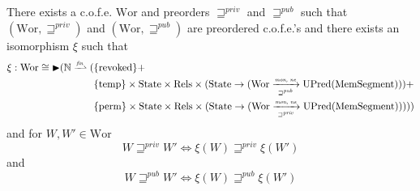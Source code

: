 \documentclass[a4paper]{article}
\newcommand{\finparfun}{\xrightharpoonup{\textit{\tiny{fin}}}}
\newcommand{\monnefun}{\xrightarrow{\textit{\tiny{mon, ne}}}}
\newcommand{\fun}{\rightarrow}
\newcommand{\blater}{\mathop{\blacktriangleright}}
\newcommand{\cofe}{c.o.f.e.}
\newcommand{\cofes}{\cofe{}'s}
\newcommand{\var}[1]{\mathit{#1}}
\newcommand{\future}{\mathbin{\sqsupseteq}}
\newcommand{\pub}{\var{pub}}
\newcommand{\priv}{\var{priv}}
\newcommand{\futurewk}{\mathbin{\sqsupseteq}^{\var{pub}}}
\newcommand{\futurestr}{\mathbin{\sqsupseteq}^{\var{priv}}}
\newcommand{\monwknefun}{\xrightarrow[\text{\tiny{$\futurewk$}}]{\textit{\tiny{mon, ne}}}}
\newcommand{\monstrnefun}{\xrightarrow[\text{\tiny{$\futurestr$}}]{\textit{\tiny{mon, ne}}}}
\newcommand{\plaindom}[1]{\mathrm{#1}}
\newcommand{\HeapSegments}{\plaindom{MemSegment}}
\newcommand{\nats}{\mathbb{N}}
\newcommand{\Rels}{\plaindom{Rels}}
\newcommand{\States}{\plaindom{State}}
\newcommand{\Wor}{\plaindom{Wor}}
\newcommand{\Worwk}{\Wor_{\futurewk}}
\newcommand{\Worstr}{\Wor_{\futurestr}}
\newcommand{\UPred}[1]{\plaindom{UPred}(#1)}
\newcommand{\plainview}[1]{\mathrm{#1}}
\newcommand{\perma}{\plainview{perm}}
\newcommand{\temp}{\plainview{temp}}
\newcommand{\revoked}{\plainview{revoked}}
\begin{document}
\begin{comment}
\begin{lemma}
There exists $\Worstr$ and $\Worwk$ are preordered \cofes{} and $\xi_\pub$ and $\xi_\priv$ are isomorphisms such that
\begin{align*}
  \xi_\pub :   \Worwk \cong \blater (\nats \finparfun (   & \{\revoked\} + \\
                                                                & \{\temp\} \times \States \times \Rels \times (\States \fun (\Worwk \monnefun \UPred{\HeapSegments})) + \\
                                                                & \{\perma\} \times \States \times \Rels \times (\States \fun (\Worstr \monnefun \UPred{\HeapSegments})),\future_\priv)) \\ \\
  \xi_\priv :   \Worstr \cong \blater (\nats \finparfun ( & \{\revoked\} \times \States \times \Rels \times (\States \fun (\Wor \monwknefun \UPred{\HeapSegments})) + \\
                                                                & \{\temp\} \times \States \times \Rels \times (\States \fun (\Worwk \monnefun \UPred{\HeapSegments})) + \\
                                                                & \{\perma\} \times \States \times \Rels \times (\States \fun (\Worstr \monnefun \UPred{\HeapSegments})),\future_\priv))
\end{align*}
\end{lemma}
\end{comment}

\begin{theorem}\label{thm:world-existence}
  There exists a \cofe{} $\Wor$ and preorders $\futurestr$ and $\futurewk$ such that $(\Wor,\futurestr)$ and $(\Wor,\futurewk)$ are preordered \cofes{} and there exists an isomorphism $\xi$ such that
  \begin{align*}
    \xi : \Wor \cong \blater (\nats \finparfun ( & \{\revoked\}  + \\
                                          & \{\temp\} \times \States \times \Rels \times (\States \fun (\Wor \monwknefun \UPred{\HeapSegments})) + \\
                                          & \{\perma\} \times \States \times \Rels \times (\States \fun (\Wor \monstrnefun \UPred{\HeapSegments}))))
  \end{align*}
 and for $W, W' \in \Wor$
 \[
   W \futurestr W' \Leftrightarrow \xi(W) \futurestr \xi(W')
 \]
and
 \[
   W \futurewk W' \Leftrightarrow \xi(W) \futurewk \xi(W')
 \]
\end{theorem}
\end{document}

